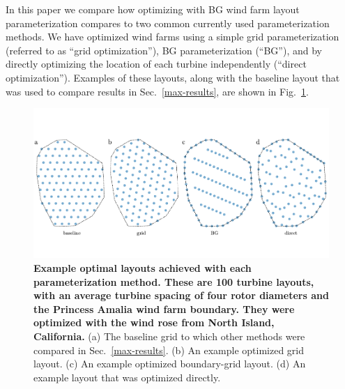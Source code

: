\documentclass[wes, manuscript]{copernicus}
\begin{document}
In this paper we compare how optimizing with BG wind farm layout parameterization compares to two common currently used parameterization methods. We have optimized wind farms using a simple grid parameterization (referred to as ``grid optimization''), BG parameterization (``BG''),  and by directly optimizing the location of each turbine independently (``direct optimization''). Examples of these layouts, along with the baseline layout that was used to compare results in Sec.~\ref{max-results}, are shown in Fig.~\ref{opt-cases}.
%
\begin{figure}
\centering
\includegraphics{paper-figures/opt-cases}
\caption{\textbf{Example optimal layouts achieved with each parameterization method. These are 100 turbine layouts, with an average turbine spacing of four rotor diameters and the Princess Amalia wind farm boundary. They were optimized with the wind rose from North Island, California.} (a) The baseline grid to which other methods were compared in Sec.~\ref{max-results}. (b) An example optimized grid layout. (c) An example optimized boundary-grid layout. (d) An example layout that was optimized directly.}
\label{opt-cases}
\end{figure}
\end{document}
